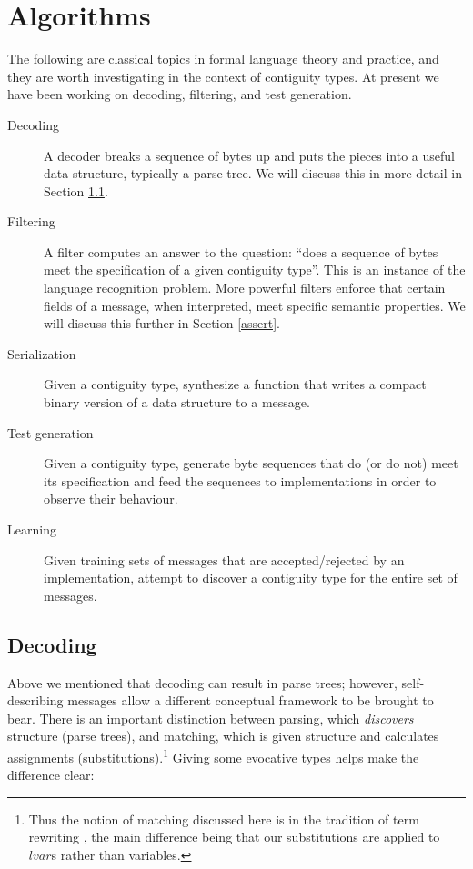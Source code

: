 \documentclass[a4paper,UKenglish,cleveref, autoref, thm-restate]{lipics-v2021}
\begin{document}
\section{Algorithms}

The following are classical topics in formal language theory and
practice, and they are worth investigating in the context of
contiguity types. At present we have been working on decoding,
filtering, and test generation.

\begin{description}

\item [Decoding] A decoder breaks a sequence of bytes up and puts the
  pieces into a useful data structure, typically a parse tree. We will
  discuss this in more detail in Section \ref{decoding}.

\item [Filtering] A filter computes an answer to the question: ``does
  a sequence of bytes meet the specification of a given contiguity
  type''. This is an instance of the language recognition
  problem. More powerful filters enforce that certain fields of a
  message, when interpreted, meet specific semantic properties. We
  will discuss this further in Section \ref{assert}.

\item [Serialization] Given a contiguity type, synthesize a function
  that writes a compact binary version of a data structure to a message.

\item [Test generation] Given a contiguity type, generate byte
  sequences that do (or do not) meet its specification and feed the
  sequences to implementations in order to observe their behaviour.

\item [Learning] Given training sets of messages that are
  accepted/rejected by an implementation, attempt to discover a
  contiguity type for the entire set of messages.

\end{description}

\subsection{Decoding}
\label{decoding}

Above we mentioned that decoding can result in parse trees; however,
self-describing messages allow a different conceptual framework to be
brought to bear. There is an important distinction between parsing,
which \emph{discovers} structure (parse trees), and matching, which is
given structure and calculates assignments
(substitutions).\footnote{Thus the notion of matching discussed here
  is in the tradition of term rewriting \cite{baader:nipkow}, the main
  difference being that our substitutions are applied to
  $\mathit{lvar}$s rather than variables.} Giving some evocative types
helps make the difference clear:
\end{document}
